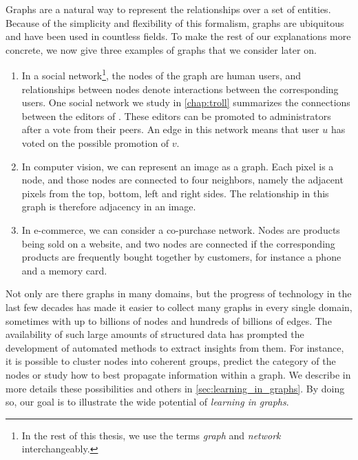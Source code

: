 Graphs are a natural way to represent the relationships over a set of entities. Because of the
simplicity and flexibility of this formalism, graphs are ubiquitous and have been used in countless
fields. To make the rest of our explanations more concrete, we now give three examples of graphs
that we consider later on.
\begin{enumerate}[nosep]%
\item In a social network\footnote{In the rest of this thesis, we use the terms \emph{graph} and
\emph{network} interchangeably.}, the nodes of the graph are human users, and relationships
between nodes denote interactions between the corresponding users. One social network we study
in \autoref{chap:troll} summarizes the connections between the editors of \wik{}. These editors
can be promoted to administrators after a vote from their peers. An edge \euv{} in this network
means that user $u$ has voted on the possible promotion of $v$.
\item In computer vision, we can represent an image as a graph. Each pixel is a node, and those
nodes are connected to four neighbors, namely the adjacent pixels from the top, bottom, left and
right sides. The relationship in this graph is therefore adjacency in an image.
\item In e-commerce, we can consider a co-purchase network. Nodes are products being sold on a
website, and two nodes are connected if the corresponding products are frequently bought
together by customers, for instance a phone and a memory card.
\end{enumerate}

Not only are there graphs in many domains, but the progress of technology in the last few decades
has made it easier to collect many graphs in every single domain, sometimes with up to billions of
nodes and hundreds of billions of edges. The availability of such large amounts of structured data has
prompted the development of automated methods to extract insights from them. For instance, it is
possible to cluster nodes into coherent groups, predict the category of the nodes or study how to
best propagate information within a graph. We describe in more details these possibilities and
others in \autoref{sec:learning_in_graphs}. By doing so, our goal is to illustrate the wide
potential of \emph{learning in graphs}.

\medskip

